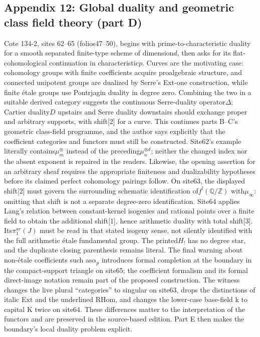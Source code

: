 \documentclass[10pt,oneside]{book}
\begin{document}
\subsection*{Appendix 12: Global duality and geometric class field theory (part D)}
Cote 134-2, sites 62--65 (folios47--50), begins with prime-to-characteristic duality for a smooth separated finite-type scheme of dimension$d$, then asks for its flat-cohomological continuation in characteristic$p$. Curves are the motivating case: cohomology groups with finite coefficients acquire proalgebraic structure, and connected unipotent groups are dualized by Serre's Ext-one construction, while finite étale groups use Pontrjagin duality in degree zero. Combining the two in a suitable derived category suggests the continuous Serre-duality operator$\Delta$; Cartier duality$D$ upstairs and Serre duality downstairs should exchange proper and arbitrary supports, with shift[2] for a curve. This continues parts B--C's geometric class-field programme, and the author says explicitly that the coefficient categories and functors must still be constructed. Site62's example literally contains$\mu_m^{\otimes}$ instead of the preceding$\mu_n^{\otimes d}$; neither the changed index nor the absent exponent is repaired in the readers. Likewise, the opening assertion for an arbitrary sheaf requires the appropriate finiteness and dualizability hypotheses before its claimed perfect cohomology pairings follow. On site63, the displayed shift[2] must govern the surrounding schematic identification of$f^!(\mathbb Q/\mathbb Z)$ with$\mu_\infty$: omitting that shift is not a separate degree-zero identification. Site64 applies Lang's relation between constant-kernel isogenies and rational points over a finite field to obtain the additional shift[1], hence arithmetic duality with total shift[3]. Its$\pi_1^{ar}(J)$ must be read in that stated isogeny sense, not silently identified with the full arithmetic étale fundamental group. The printed$H_!$ has no degree star, and the duplicate closing parenthesis remains literal. The final warning about non-étale coefficients such as$\alpha_p$ introduces formal completion at the boundary in the compact-support triangle on site65; the coefficient formalism and its formal direct-image notation remain part of the proposed construction. The witness changes the live plural ``categories'' to singular on site63, drops the distinctions of italic Ext and the underlined RHom, and changes the lower-case base-field k to capital K twice on site64. These differences matter to the interpretation of the functors and are preserved in the source-based edition. Part E then makes the boundary's local duality problem explicit.
\end{document}
